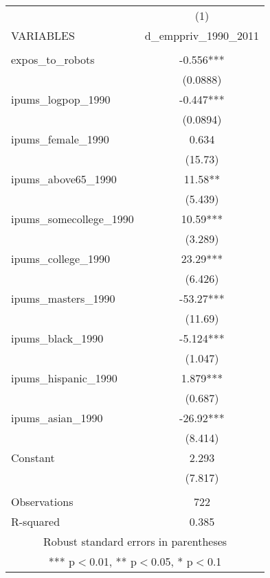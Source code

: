 \documentclass[]{article}
\begin{document}
\begin{tabular}{lc} \hline
 & (1) \\
VARIABLES & d\_emppriv\_1990\_2011 \\ \hline
 &  \\
expos\_to\_robots & -0.556*** \\
 & (0.0888) \\
ipums\_logpop\_1990 & -0.447*** \\
 & (0.0894) \\
ipums\_female\_1990 & 0.634 \\
 & (15.73) \\
ipums\_above65\_1990 & 11.58** \\
 & (5.439) \\
ipums\_somecollege\_1990 & 10.59*** \\
 & (3.289) \\
ipums\_college\_1990 & 23.29*** \\
 & (6.426) \\
ipums\_masters\_1990 & -53.27*** \\
 & (11.69) \\
ipums\_black\_1990 & -5.124*** \\
 & (1.047) \\
ipums\_hispanic\_1990 & 1.879*** \\
 & (0.687) \\
ipums\_asian\_1990 & -26.92*** \\
 & (8.414) \\
Constant & 2.293 \\
 & (7.817) \\
 &  \\
Observations & 722 \\
 R-squared & 0.385 \\ \hline
\multicolumn{2}{c}{ Robust standard errors in parentheses} \\
\multicolumn{2}{c}{ *** p$<$0.01, ** p$<$0.05, * p$<$0.1} \\
\end{tabular}
\end{document}
